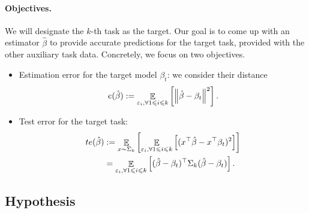 \paragraph{Objectives.}
We will designate the $k$-th task as the target.
Our goal is to come up with an estimator $\hat{\beta}$ to provide accurate predictions for the target task, provided with the other auxiliary task data.
Concretely, we focus on two objectives.
\begin{itemize}
	\item Estimation error for the target model $\beta_t$: we consider their distance
		\[ e(\hat{\beta}) := \mathop{\mathbb{E}}_{\varepsilon_i, \forall 1\leqslant i\leqslant k}\left[ \left\| \hat{\beta} - \beta_t \right\|^2 \right]. \]
	\item Test error for the target task:
		\begin{align*}
			te(\hat{\beta}) &:= \mathop{\mathbb{E}}_{x \sim \Sigma_k}\left[ \mathop{\mathbb{E}}_{{\varepsilon_i, \forall 1\leqslant i\leqslant k}}\left[ (x^{\top}\hat{\beta} - x^{\top}\beta_t)^2 \right] \right] \\
			&= \mathop{\mathbb{E}}_{\varepsilon_i, \forall 1\leqslant i\leqslant k}\left[ (\hat{\beta} - \beta_t)^{\top}\Sigma_k(\hat{\beta} - \beta_t) \right].
		\end{align*}
\end{itemize}


\subsection{Hypothesis}

